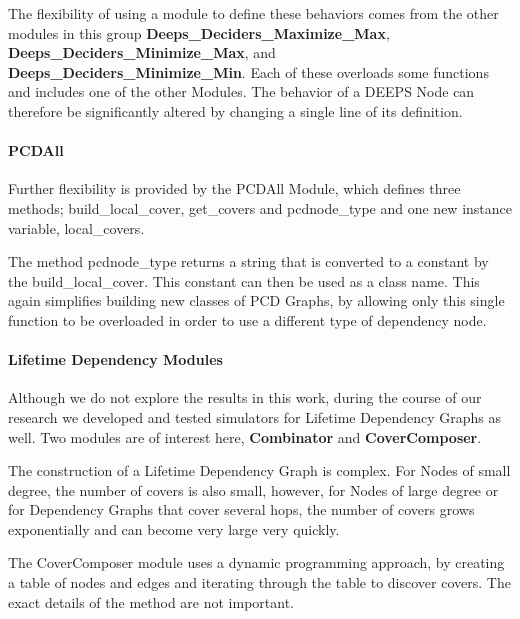 \documentclass[technote, 10pt, letter]{IEEEtran}
\begin{document}
The flexibility of using a module to define these behaviors comes from the other modules in this group {\bfseries Deeps\_Deciders\_Maximize\_Max}, {\bfseries Deeps\_Deciders\_Minimize\_Max}, and {\bfseries Deeps\_Deciders\_Minimize\_Min}. Each of these overloads some functions and includes one of the other Modules. The behavior of a DEEPS Node can therefore be significantly altered by changing a single line of its definition. 


\paragraph{PCDAll}

Further flexibility is provided by the PCDAll Module, which defines three methods; {\ttfamily build\_local\_cover}, {\ttfamily get\_covers} and {\ttfamily pcdnode\_type} and one new instance variable, {\ttfamily local\_covers}. 

The method {\ttfamily pcdnode\_type} returns a string that is converted to a constant by the {\ttfamily build\_local\_cover}. This constant can then be used as a class name. This again simplifies building new classes of PCD Graphs, by allowing only this single function to be overloaded in order to use a different type of dependency node. 



\paragraph{Lifetime Dependency Modules}

Although we do not explore the results in this work, during the course of our research we developed and tested simulators for Lifetime Dependency Graphs as well. Two modules are of interest here, {\bfseries Combinator} and {\bfseries CoverComposer}.

The construction of a Lifetime Dependency Graph is complex. For Nodes of small degree, the number of covers is also small, however, for Nodes of large degree or for Dependency Graphs that cover several hops, the number of covers grows exponentially and can become very large very quickly.



The CoverComposer module uses a dynamic programming approach, by creating a table of nodes and edges and iterating through the table to discover covers. The exact details of the method are not important. 
\end{document}
